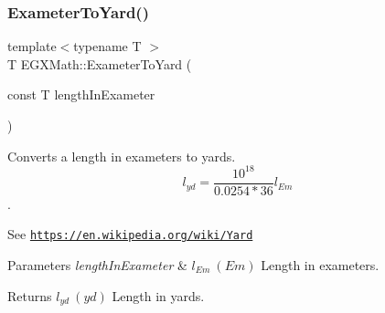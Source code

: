 \subsubsection{\texorpdfstring{Exameter\+To\+Yard()}{ExameterToYard()}}
{\footnotesize\ttfamily template$<$typename T $>$ \\
T E\+G\+X\+Math\+::\+Exameter\+To\+Yard (\begin{DoxyParamCaption}\item[{const T}]{length\+In\+Exameter }\end{DoxyParamCaption})}



Converts a length in exameters to yards. \[ l_{yd}= \frac{10^{18}}{0.0254 * 36} l_{Em} \]. 

See \href{https://en.wikipedia.org/wiki/Yard}{\tt https\+://en.\+wikipedia.\+org/wiki/\+Yard} 
\begin{DoxyParams}{Parameters}
{\em length\+In\+Exameter} & $ l_{Em}\ (Em)$ Length in exameters. \\
\hline
\end{DoxyParams}
\begin{DoxyReturn}{Returns}
$ l_{yd}\ (yd)$ Length in yards. 
\end{DoxyReturn}
